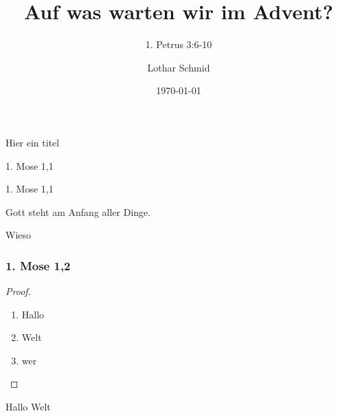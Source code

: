 \documentclass{mybibbeamer}
\title{Auf was warten wir im Advent?}
\subtitle{1. Petrus 3:6-10}
\author{Lothar Schmid}
\date{\today}
\begin{document}
 
\begin{frame} {Hier ein titel}
    \titlepage 
\end{frame} 
\begin{frame}{1. Mose 1,1} 
    
    \begin{mnrblock}{1. Mose 1,1}
    \vspace{1em}
    
    Gott steht am Anfang aller Dinge. 

    Wieso
    \end{mnrblock}
\end{frame} 
\begin{frame}

        \frametitle{1. Mose 1,2} 
        \begin{proof}
            \begin{enumerate}
              \item Hallo
              \item Welt
              \item wer
            \end{enumerate}    
        \end{proof}    
        \pause
    \begin{theorem}
    Hallo Welt
    \end{theorem}
    
\end{frame} 
\end{document}

